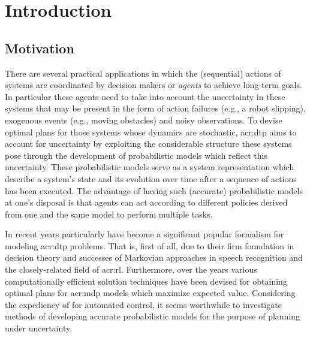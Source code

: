 \chapter{Introduction}
\label{ch:introduction}

% 

\section{Motivation}
\label{sec:motivation}

There are several practical applications in which the (sequential) actions of systems are coordinated by decision makers or \textit{agents} to achieve long-term goals.
In particular these agents need to take into account the uncertainty in these systems that may be present in the form of action failures (e.g., a robot slipping), exogenous events (e.g., moving obstacles) and noisy observations.
To devise optimal plans for those systems whose dynamics are stochastic, \acrfull{acr:dtp} aims to account for uncertainty by exploiting the considerable structure these systems pose through the development of probabilistic models which reflect this uncertainty.
These probabilistic models serve as a system representation which describe a system's state and its evolution over time after a sequence of actions has been executed.
The advantage of having such (accurate) probabilistic models at one's disposal is that agents can act according to different policies derived from one and the same model to perform multiple tasks.

In recent years particularly  have become a significant popular formalism for modeling \acrshort{acr:dtp} problems. 
That is, first of all, due to their firm foundation in decision theory and successes of Markovian approaches in speech recognition and the closely-related field of \acrfull{acr:rl}.
Furthermore, over the years various computationally efficient solution techniques have been devised for obtaining optimal plans for \acrshort{acr:mdp} models which maximize expected value.
Considering the expediency of  for automated control, it seems worthwhile to investigate methods of developing accurate probabilistic models for the purpose of planning under uncertainty.



